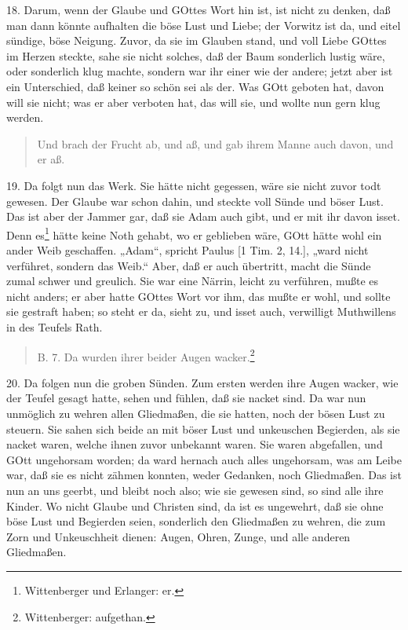 18. Darum, wenn der Glaube und GOttes Wort hin ist, ist nicht zu denken, daß man dann könnte aufhalten die böse Lust und Liebe; der Vorwitz ist da, und eitel sündige, böse Neigung. Zuvor, da sie im Glauben stand, und voll Liebe GOttes im Herzen steckte, sahe sie nicht solches, daß der Baum sonderlich lustig wäre, oder sonderlich klug machte, sondern war ihr einer wie der andere; jetzt aber ist ein Unterschied, daß keiner so schön sei als der. Was GOtt geboten hat, davon will sie nicht; was er aber verboten hat, das will sie, und wollte nun gern klug werden.

\begin{quote}
Und brach der Frucht ab, und aß, und gab ihrem Manne auch davon, und er aß.
\end{quote}

19. Da folgt nun das Werk. Sie hätte nicht gegessen, wäre sie nicht zuvor todt gewesen. Der Glaube war schon dahin, und steckte voll Sünde und böser Lust. Das ist aber der Jammer gar, daß sie Adam auch gibt, und er mit ihr davon isset. Denn es\footnote{Wittenberger und Erlanger: er.} hätte keine Noth gehabt, wo er geblieben wäre, GOtt hätte wohl ein ander Weib geschaffen. „Adam“, spricht Paulus [1 Tim. 2, 14.], „ward nicht verführet, sondern das Weib.“ Aber, daß er auch übertritt, macht die Sünde zumal schwer und greulich. Sie war eine Närrin, leicht zu verführen, mußte es nicht anders; er aber hatte GOttes Wort vor ihm, das mußte er wohl, und sollte sie gestraft haben; so steht er da, sieht zu, und isset auch, verwilligt Muthwillens in des Teufels Rath.

\begin{quote}
B. 7. Da wurden ihrer beider Augen wacker.\footnote{Wittenberger: aufgethan.}
\end{quote}

20. Da folgen nun die groben Sünden. Zum ersten werden ihre Augen wacker, wie der Teufel gesagt hatte, sehen und fühlen, daß sie nacket sind. Da war nun unmöglich zu wehren allen Gliedmaßen, die sie hatten, noch der bösen Lust zu steuern. Sie sahen sich beide an mit böser Lust und unkeuschen Begierden, als sie nacket waren, welche ihnen zuvor unbekannt waren. Sie waren abgefallen, und GOtt ungehorsam worden; da ward hernach auch alles ungehorsam, was am Leibe war, daß sie es nicht zähmen konnten, weder Gedanken, noch Gliedmaßen. Das ist nun an uns geerbt, und bleibt noch also; wie sie gewesen sind, so sind alle ihre Kinder. Wo nicht Glaube und Christen sind, da ist es ungewehrt, daß sie ohne böse Lust und Begierden seien, sonderlich den Gliedmaßen zu wehren, die zum Zorn und Unkeuschheit dienen: Augen, Ohren, Zunge, und alle anderen Gliedmaßen.

